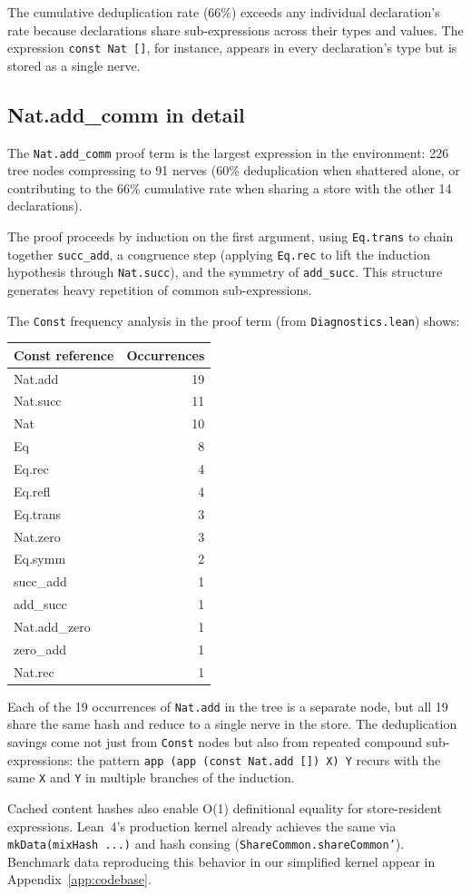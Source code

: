 The cumulative deduplication rate (66\%) exceeds any individual declaration's rate because declarations share sub-expressions across their types and values.  The expression \texttt{const Nat []}, for instance, appears in every declaration's type but is stored as a single nerve.

\subsection{Nat.add\_comm in detail}

The \texttt{Nat.add\_comm} proof term is the largest expression in the environment: 226 tree nodes compressing to 91 nerves (60\% deduplication when shattered alone, or contributing to the 66\% cumulative rate when sharing a store with the other 14 declarations).

The proof proceeds by induction on the first argument, using \texttt{Eq.trans} to chain together \texttt{succ\_add}, a congruence step (applying \texttt{Eq.rec} to lift the induction hypothesis through \texttt{Nat.succ}), and the symmetry of \texttt{add\_succ}.  This structure generates heavy repetition of common sub-expressions.

The \texttt{Const} frequency analysis in the proof term (from \texttt{Diagnostics.lean}) shows:

\begin{center}
\begin{tabular}{@{}lr@{}}
\toprule
Const reference & Occurrences \\
\midrule
Nat.add & 19 \\
Nat.succ & 11 \\
Nat & 10 \\
Eq & 8 \\
Eq.rec & 4 \\
Eq.refl & 4 \\
Eq.trans & 3 \\
Nat.zero & 3 \\
Eq.symm & 2 \\
succ\_add & 1 \\
add\_succ & 1 \\
Nat.add\_zero & 1 \\
zero\_add & 1 \\
Nat.rec & 1 \\
\bottomrule
\end{tabular}
\end{center}

Each of the 19 occurrences of \texttt{Nat.add} in the tree is a separate node, but all 19 share the same hash and reduce to a single nerve in the store.  The deduplication savings come not just from \texttt{Const} nodes but also from repeated compound sub-expressions: the pattern \texttt{app (app (const Nat.add []) X) Y} recurs with the same \texttt{X} and \texttt{Y} in multiple branches of the induction.

Cached content hashes also enable O(1) definitional equality for store-resident expressions.  Lean~4's production kernel already achieves the same via \texttt{mkData(mixHash ...)} and hash consing (\texttt{ShareCommon.shareCommon'}).  Benchmark data reproducing this behavior in our simplified kernel appear in Appendix~\ref{app:codebase}.

